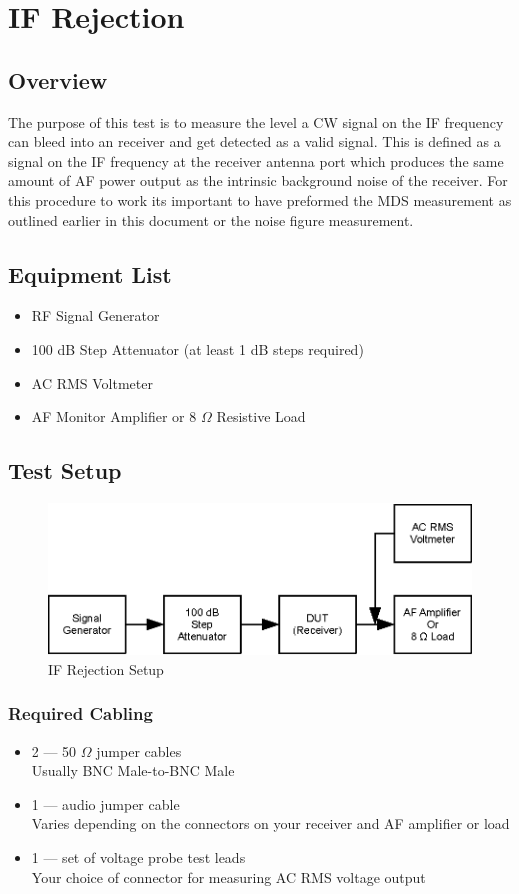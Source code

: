 \documentclass[10pt,letterpaper]{book}
\begin{document}
\newpage

\section{IF Rejection}

\subsection*{Overview}
The purpose of this test is to measure the level a CW signal on the IF frequency can bleed into an receiver and get detected as a valid signal. This is defined as a signal on the IF frequency at the receiver antenna port which produces the same amount of AF power output as the intrinsic background noise of the receiver.  For this procedure to work its important to have preformed the MDS measurement as outlined earlier in this document or the noise figure measurement. 
\subsection*{Equipment List}
\begin{itemize}
	\item RF Signal Generator
	\item 100 dB Step Attenuator (at least 1 dB steps required)
	\item AC RMS Voltmeter%
	\item AF Monitor Amplifier or 8 $\Omega$ Resistive Load
\end{itemize}
\subsection*{Test Setup}
\begin{figure}[h]
\centering
\includegraphics[scale=1]{Illustrations/MDSSetup}
\caption{IF Rejection Setup}
\end{figure}
\subsubsection*{Required Cabling}
\begin{itemize}
	\item 2 --- 50 $\Omega$ jumper cables \\
		Usually BNC Male-to-BNC Male
	\item 1 --- audio jumper cable \\
		Varies depending on the connectors on your receiver and AF amplifier or load
	\item 1 --- set of voltage probe test leads \\
		Your choice of connector for measuring AC RMS voltage output
\end{itemize}
\end{document}
